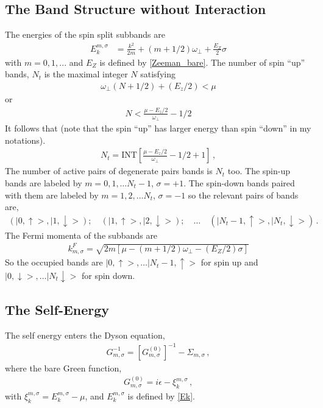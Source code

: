 \subsection{The Band Structure without Interaction}
The energies of the spin split subbands are
\begin{align}\label{Ek}
E_k^{m,\sigma} & = \frac{k^2}{ 2 m } + (m+1/2) \omega_{\perp} +\frac{E_Z}{2} \sigma
\end{align}
with $m = 0,1,...$ and $E_Z$ is defined by \eqref{Zeeman_bare}. 
The number of spin ``up'' bands, $N_{t}$ is the maximal integer $N$ satisfying
\begin{align}
\omega_{\perp} ( N+ 1/2 ) + (E_z/2) < \mu
\end{align}
or
\begin{align}
N  < \frac{\mu - E_z/2}{\omega_{\perp}} - 1/2
\end{align}
It follows that (note that the spin ``up'' has larger energy than spin ``down'' in my notations).
\begin{align}\label{Nt}
N_t = \mathrm{INT} \left[ \frac{\mu - E_z/2}{\omega_{\perp}} - 1/2 + 1 \right] \, ,
\end{align}
The number of active pairs of degenerate pairs bands is $N_t$ too.
The spin-up bands are labeled by $m = 0,1,\ldots N_t-1$, $\sigma = +1$.
The spin-down bands paired with them are labeled by
$m = 1,2, \ldots N_t$, $\sigma=-1$ so the relevant pairs of bands are,
\begin{align}\label{pairs}
(|0, \uparrow>, |1, \downarrow>); \quad ( |1, \uparrow>, |2, \downarrow>); \quad \ldots \quad (|N_t-1, \uparrow>, |N_t, \downarrow>)\, .
\end{align}
%
The Fermi momenta of the subbands are
\begin{align}\label{kF}
k^F_{m,\sigma} = \sqrt{ 2m [\mu -(m+1/2) \omega_{\perp} - (E_Z/2) \sigma ]}
\end{align}
%
So the occupied bands are $|0, \uparrow>, \ldots |N_{t}-1,\uparrow>$ for spin up and $|0, \downarrow>, \ldots | N_{t}\downarrow>$ for spin down.
%
%
\subsection{The Self-Energy}
The self energy enters the Dyson equation,
\begin{align}\label{Dyson}
G_{m,\sigma}^{-1} = \left[ G_{m,\sigma}^{(0)} \right]^{-1} - \Sigma_{m,\sigma}\, ,
\end{align}
where the bare Green function,
\begin{align}\label{Dyson_1}
G_{m,\sigma}^{(0)}  =  i \epsilon - \xi_k^{m,\sigma}  \, ,
\end{align}
with $\xi_k^{m,\sigma} = E_k^{m,\sigma} - \mu$, and $E_k^{m,\sigma}$ is defined by \eqref{Ek}.

